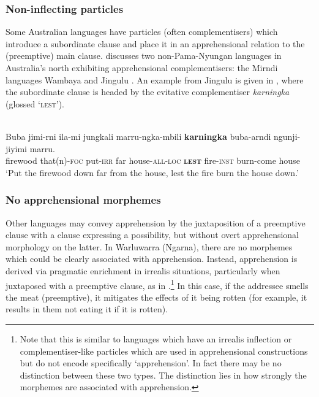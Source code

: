 \documentclass[output=paper,colorlinks,citecolor=brown]{langscibook}
\begin{document}
\subsubsection{Non-inflecting particles}

Some Australian languages have particles (often complementisers) which introduce a subordinate clause and place it in an apprehensional relation to the (preemptive) main clause. \citet{zester_semantics_2010} discusses two non-Pama-Nyungan languages in Australia's north exhibiting apprehensional complementisers: the Mirndi languages Wambaya \citep[210]{nordlinger_grammar_1998} and Jingulu \citep{pensalfini_grammar_2003}. An example from Jingulu is given in , where the subordinate clause is headed by the evitative complementiser \textit{karningka} (glossed `\textsc{lest}').

\ea 
{} {\citealt[120]{pensalfini_grammar_2003}} \\
\gll Buba jimi-rni ila-mi jungkali marru-ngka-mbili \textbf{karningka}  buba-arndi ngunji-jiyimi marru. \\
firewood that(n)-\textsc{foc} put-\textsc{irr} far house-\textsc{all-loc} \textbf{\textsc{lest}} fire-\textsc{inst} burn-come house \\
\glt `Put the firewood down far from the house, lest the fire burn the house down.'
\label{ex:bro12}
\z

\subsubsection{No apprehensional morphemes}

Other languages may convey apprehension by the juxtaposition of a preemptive clause with a clause expressing a possibility, but without overt apprehensional morphology on the latter. In Warluwarra (Ngarna), there are no morphemes which could be clearly associated with apprehension. Instead, apprehension is derived via pragmatic enrichment in irrealis situations, particularly when juxtaposed with a preemptive clause, as in .\footnote{Note that this is similar to languages which have an irrealis inflection or complementiser-like particles which are used in apprehensional constructions but do not encode specifically `apprehension'. In fact there may be no distinction between these two types. The distinction lies in how strongly the morphemes are associated with apprehension.} In this case, if the addressee smells the meat (preemptive), it mitigates the effects of it being rotten (for example, it results in them not eating it if it is rotten).
\end{document}

